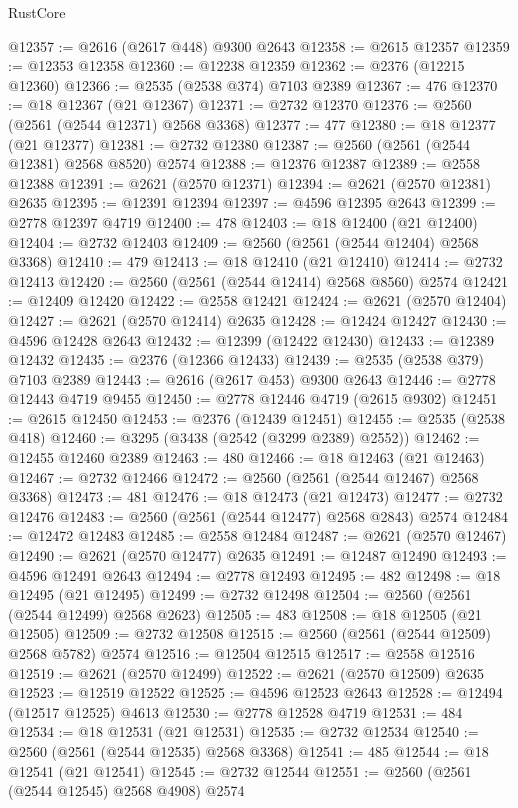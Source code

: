 \begin{lexlean}{RustCore}
\begin{coremodule}
@12357 := @2616 (@2617 @448) @9300 @2643
@12358 := @2615 @12357
@12359 := @12353 @12358
@12360 := @12238 @12359
@12362 := @2376 (@12215 @12360)
@12366 := @2535 (@2538 @374) @7103 @2389
@12367 := 476
@12370 := @18 @12367 (@21 @12367)
@12371 := @2732 @12370
@12376 := @2560 (@2561 (@2544 @12371) @2568 @3368)
@12377 := 477
@12380 := @18 @12377 (@21 @12377)
@12381 := @2732 @12380
@12387 := @2560 (@2561 (@2544 @12381) @2568 @8520) @2574
@12388 := @12376 @12387
@12389 := @2558 @12388
@12391 := @2621 (@2570 @12371)
@12394 := @2621 (@2570 @12381) @2635
@12395 := @12391 @12394
@12397 := @4596 @12395 @2643
@12399 := @2778 @12397 @4719
@12400 := 478
@12403 := @18 @12400 (@21 @12400)
@12404 := @2732 @12403
@12409 := @2560 (@2561 (@2544 @12404) @2568 @3368)
@12410 := 479
@12413 := @18 @12410 (@21 @12410)
@12414 := @2732 @12413
@12420 := @2560 (@2561 (@2544 @12414) @2568 @8560) @2574
@12421 := @12409 @12420
@12422 := @2558 @12421
@12424 := @2621 (@2570 @12404)
@12427 := @2621 (@2570 @12414) @2635
@12428 := @12424 @12427
@12430 := @4596 @12428 @2643
@12432 := @12399 (@12422 @12430)
@12433 := @12389 @12432
@12435 := @2376 (@12366 @12433)
@12439 := @2535 (@2538 @379) @7103 @2389
@12443 := @2616 (@2617 @453) @9300 @2643
@12446 := @2778 @12443 @4719 @9455
@12450 := @2778 @12446 @4719 (@2615 @9302)
@12451 := @2615 @12450
@12453 := @2376 (@12439 @12451)
@12455 := @2535 (@2538 @418)
@12460 := @3295 (@3438 (@2542 (@3299 @2389) @2552))
@12462 := @12455 @12460 @2389
@12463 := 480
@12466 := @18 @12463 (@21 @12463)
@12467 := @2732 @12466
@12472 := @2560 (@2561 (@2544 @12467) @2568 @3368)
@12473 := 481
@12476 := @18 @12473 (@21 @12473)
@12477 := @2732 @12476
@12483 := @2560 (@2561 (@2544 @12477) @2568 @2843) @2574
@12484 := @12472 @12483
@12485 := @2558 @12484
@12487 := @2621 (@2570 @12467)
@12490 := @2621 (@2570 @12477) @2635
@12491 := @12487 @12490
@12493 := @4596 @12491 @2643
@12494 := @2778 @12493
@12495 := 482
@12498 := @18 @12495 (@21 @12495)
@12499 := @2732 @12498
@12504 := @2560 (@2561 (@2544 @12499) @2568 @2623)
@12505 := 483
@12508 := @18 @12505 (@21 @12505)
@12509 := @2732 @12508
@12515 := @2560 (@2561 (@2544 @12509) @2568 @5782) @2574
@12516 := @12504 @12515
@12517 := @2558 @12516
@12519 := @2621 (@2570 @12499)
@12522 := @2621 (@2570 @12509) @2635
@12523 := @12519 @12522
@12525 := @4596 @12523 @2643
@12528 := @12494 (@12517 @12525) @4613
@12530 := @2778 @12528 @4719
@12531 := 484
@12534 := @18 @12531 (@21 @12531)
@12535 := @2732 @12534
@12540 := @2560 (@2561 (@2544 @12535) @2568 @3368)
@12541 := 485
@12544 := @18 @12541 (@21 @12541)
@12545 := @2732 @12544
@12551 := @2560 (@2561 (@2544 @12545) @2568 @4908) @2574

\end{coremodule}
\end{lexlean}
